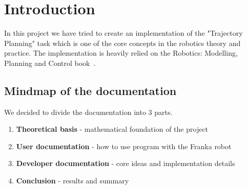 
\chapter{Introduction}\label{chapter:introduction}
In this project we have tried to create an implementation of the "Trajectory Planning" task which is one of the core concepts in the robotics theory and practice. The implementation is heavily relied on the Robotics: Modelling, Planning and Control book~\parencite{robotics_book}.  

\section{Mindmap of the documentation}
We decided to divide the documentation into 3 parts. 
\begin{enumerate}
    \item \textbf{Theoretical basis} - mathematical foundation of the project
    \item \textbf{User documentation} - how to use program with the Franka robot
    \item  \textbf{Developer documentation} - core ideas and implementation details 
    \item \textbf{Conclusion} - results and summary
\end{enumerate}

